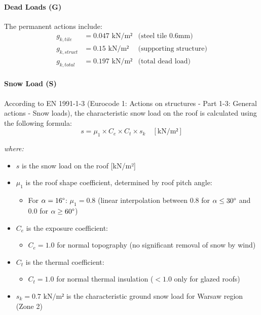 \documentclass[12pt,a4paper]{article}
\begin{document}
\paragraph{Dead Loads (G)}
The permanent actions include:
\begin{equation}
\begin{aligned}
g_{k,tile} &= 0.047 \text{ kN/m²} & \text{(steel tile 0.6mm)} \\
g_{k,struct} &= 0.15 \text{ kN/m²} & \text{(supporting structure)} \\
g_{k,total} &= 0.197 \text{ kN/m²} & \text{(total dead load)}
\end{aligned}
\end{equation}

\paragraph{Snow Load (S)}
According to EN 1991-1-3 (Eurocode 1: Actions on structures - Part 1-3: General actions - Snow loads), the characteristic snow load on the roof is calculated using the following formula:
\begin{equation}
s = \mu_1 \times C_e \times C_t \times s_k \quad [\text{kN/m²}]
\end{equation}

\noindent
\textit{where:}
\begin{itemize}
    \item $s$ is the snow load on the roof [kN/m²]
    \item $\mu_1$ is the roof shape coefficient, determined by roof pitch angle:
        \begin{itemize}
            \item For $\alpha = 16\degree$: $\mu_1 = 0.8$ (linear interpolation between 0.8 for $\alpha \leq 30\degree$ and 0.0 for $\alpha \geq 60\degree$)
        \end{itemize}
    \item $C_e$ is the exposure coefficient:
        \begin{itemize}
            \item $C_e = 1.0$ for normal topography (no significant removal of snow by wind)
        \end{itemize}
    \item $C_t$ is the thermal coefficient:
        \begin{itemize}
            \item $C_t = 1.0$ for normal thermal insulation ($< 1.0$ only for glazed roofs)
        \end{itemize}
    \item $s_k = 0.7 \text{ kN/m²}$ is the characteristic ground snow load for Warsaw region (Zone 2)
\end{itemize}
\end{document}
